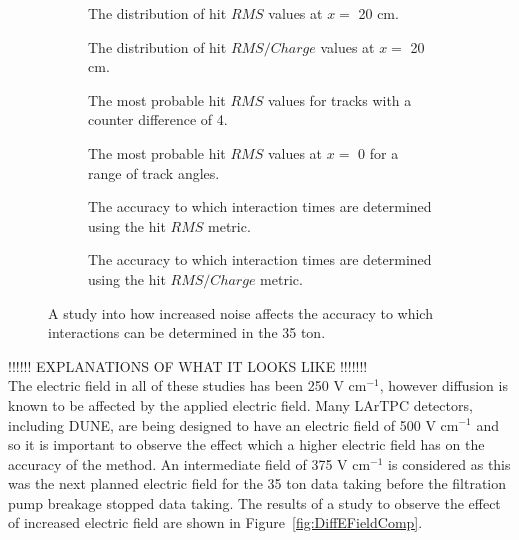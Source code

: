 \begin{figure}[h!]
  \centering  \begin{subfigure}{0.45\textwidth}
    \centering
    \caption{The distribution of hit $RMS$ values at $x =$ 20 cm.}
    \label{fig:DiffLifetimeComp1}
  \end{subfigure}
  \hspace{0.08\textwidth}
  \begin{subfigure}{0.45\textwidth}
    \centering
    \caption{The distribution of hit $RMS/Charge$ values at $x =$ 20 cm.}
    \label{fig:DiffLifetimeComp2}
  \end{subfigure}
  \begin{subfigure}{0.45\textwidth}
    \centering
    \caption{The most probable hit $RMS$ values for tracks with a counter difference of 4.}
    \label{fig:DiffLifetimeComp3}
  \end{subfigure}
  \hspace{0.08\textwidth}
  \begin{subfigure}{0.45\textwidth}
    \centering
    \caption{The most probable hit $RMS$ values at $x = $ 0 for a range of track angles.}
    \label{fig:DiffLifetimeComp4}
  \end{subfigure}
  \begin{subfigure}{0.45\textwidth}
    \centering
    \caption{The accuracy to which interaction times are determined using the hit $RMS$ metric.}
    \label{fig:DiffLifetimeComp5}
  \end{subfigure}
  \hspace{0.08\textwidth}
  \begin{subfigure}{0.45\textwidth}
    \centering
    \caption{The accuracy to which interaction times are determined using the hit $RMS/Charge$ metric.}
    \label{fig:DiffLifetimeComp6}
  \end{subfigure}
  \caption[The effect that an increased electron lifetime has on the accuracy of interaction time determination]
          {A study into how increased noise affects the accuracy to which interactions can be determined in the 35 ton.}
          \label{fig:DiffLifetimeComp}
\end{figure}

!!!!!! EXPLANATIONS OF WHAT IT LOOKS LIKE !!!!!!! \\

The electric field in all of these studies has been 250 V cm$^{-1}$, however diffusion is known to be affected by the applied electric field. Many LArTPC detectors, including DUNE, are being designed to have an electric field of 500 V cm$^{-1}$ and so it is important to observe the effect which a higher electric field has on the accuracy of the method. An intermediate field of 375 V cm$^{-1}$ is considered as this was the next planned electric field for the 35 ton data taking before the filtration pump breakage stopped data taking. The results of a study to observe the effect of increased electric field are shown in Figure~\ref{fig:DiffEFieldComp}. \\

